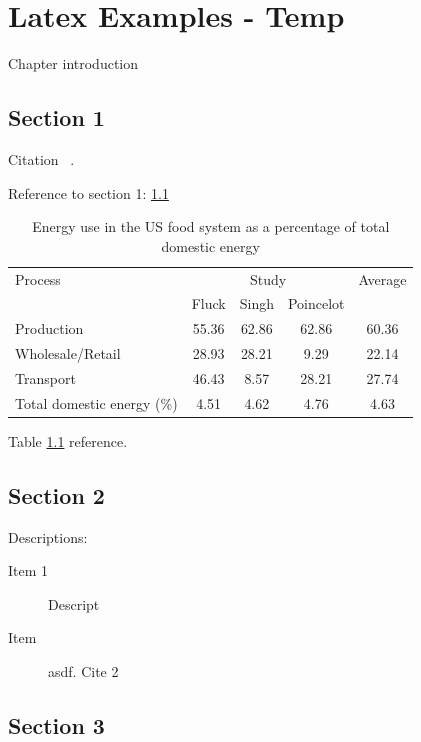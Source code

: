 \chapter{Latex Examples - Temp} 

Chapter introduction

\section{Section 1}
\label{sec:sec-1}

Citation ~\cite{s:source1}.

Reference to section 1: \ref{sec:sec-1}

\begin{table}[h]
\centering
\caption{Energy use in the US food system as a percentage of total domestic energy}
\label{tab_agric_energy}
\vspace{6pt}
\begin{tabular}{lcccc}
\toprule
Process & \multicolumn{3}{c}{Study} & Average \\
\cmidrule(r){2-4}
 & Fluck & Singh & Poincelot & \\
\midrule
Production & 55.36  & 62.86 & 62.86 & 60.36 \\
Wholesale/Retail & 28.93    & 28.21 & 9.29  & 22.14 \\
Transport & 46.43   & 8.57  & 28.21 & 27.74 \\
\midrule
\midrule
Total domestic energy (\%) & 4.51   & 4.62  & 4.76  & 4.63 \\
\bottomrule
\end{tabular}
\end{table}

Table \ref{tab_agric_energy} reference.

\section{Section 2}
\label{sec:sec-2}

Descriptions:

\begin{description}

\item[Item 1]
Descript

\item[Item]
asdf. Cite 2 ~\cite{s:source2}

\end{description}

\section{Section 3}

